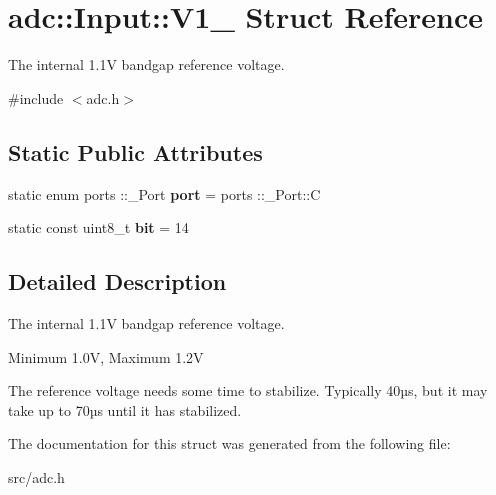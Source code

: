 \hypertarget{structadc_1_1Input_1_1V1__1}{}\section{adc\+:\+:Input\+:\+:V1\+\_ Struct Reference}
\label{structadc_1_1Input_1_1V1__1}


The internal 1.\+1V bandgap reference voltage.  




{\ttfamily \#include $<$adc.\+h$>$}

\subsection*{Static Public Attributes}
\begin{DoxyCompactItemize}
\item 
\hypertarget{structadc_1_1Input_1_1V1__1_a0f6e5910e843675ac0a56d2c5b4d9ef6}{}\label{structadc_1_1Input_1_1V1__1_a0f6e5910e843675ac0a56d2c5b4d9ef6} 
static enum ports \+::\+\_\+\+Port {\bfseries port} = ports \+::\+\_\+\+Port\+::C
\item 
\hypertarget{structadc_1_1Input_1_1V1__1_a810f3c569f78bd751aa399ace63d586d}{}\label{structadc_1_1Input_1_1V1__1_a810f3c569f78bd751aa399ace63d586d} 
static const uint8\+\_\+t {\bfseries bit} = 14
\end{DoxyCompactItemize}


\subsection{Detailed Description}
The internal 1.\+1V bandgap reference voltage. 

Minimum 1.\+0V, Maximum 1.\+2V

The reference voltage needs some time to stabilize. Typically 40µs, but it may take up to 70µs until it has stabilized. 

The documentation for this struct was generated from the following file\+:\begin{DoxyCompactItemize}
\item 
src/adc.\+h\end{DoxyCompactItemize}
